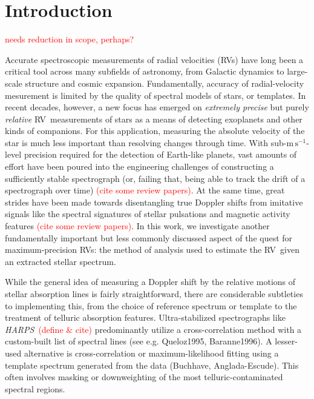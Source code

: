\documentclass[modern]{aastex62}
\newcommand{\unit}[1]{\mathrm{#1}}
\newcommand{\m}{\unit{m}}
\newcommand{\s}{\unit{s}}
\newcommand{\ms}{\m\,\s^{-1}}
\newcommand{\todo}[1]{\textcolor{red}{#1}}  %
\newcommand{\acronym}[1]{{\small{#1}}}
\newcommand{\project}[1]{\textsl{#1}}
\newcommand{\HARPS}{\project{\acronym{HARPS}}}
\newcommand{\RV}{\acronym{RV}}
\begin{document}

\section{Introduction}

\todo{needs reduction in scope, perhaps?}

Accurate spectroscopic measurements of radial velocities (\RV s) have long been a critical tool across many subfields of astronomy, from Galactic dynamics to large-scale structure and cosmic expansion.
Fundamentally, accuracy of radial-velocity mesurement is limited by the quality of spectral models of stars, or templates.
In recent decades, however, a new focus has emerged on \emph{extremely precise} but purely \emph{relative} \RV\ measurements of stars as a means of detecting exoplanets and other kinds of companions.
For this application, measuring the absolute velocity of the star is much less important than resolving changes through time.
With sub-$\ms$-level precision required for the detection of Earth-like planets, vast amounts of effort have been poured into the engineering challenges of constructing a sufficiently stable spectrograph (or, failing that, being able to track the drift of a spectrograph over time) \todo{(cite some review papers)}. At the same time, great strides have been made towards disentangling true Doppler shifts from imitative signals like the spectral signatures of stellar pulsations and magnetic activity features \todo{(cite some review papers)}.  In this work, we investigate another fundamentally important but less commonly discussed aspect of the quest for maximum-precision \RV s: the method of analysis used to estimate the \RV\ given an extracted stellar spectrum.

While the general idea of measuring a Doppler shift by the relative motions of stellar absorption lines is fairly straightforward, there are considerable subtleties to implementing this, from the choice of reference spectrum or template to the treatment of telluric absorption features. Ultra-stabilized spectrographs like \HARPS\ \todo{(define \& cite)} predominantly utilize a cross-correlation method with a custom-built list of spectral lines (see e.g. Queloz1995, Baranne1996). 
A lesser-used alternative is cross-correlation or maximum-likelihood fitting using a template spectrum generated from the data (Buchhave, Anglada-Escude). 
This often involves masking or downweighting of the most telluric-contaminated spectral regions.
\end{document}
